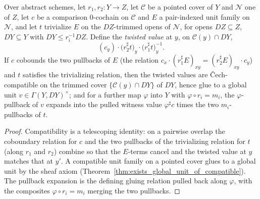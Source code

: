 \begin{theorem}
  \label{thm:exists_glued_unitsTrivTwist}
  \leanok
  Over abstract schemes, let \(r_1, r_2 \colon Y \to Z\), let \(\mathcal C\) be a pointed cover of
  \(Y\) and \(\mathcal N\) one of \(Z\), let \(c\) be a comparison \(0\)-cochain on \(\mathcal C\)
  and \(E\) a pair-indexed unit family on \(\mathcal N\), and let \(t\) trivialize \(E\) on the
  \(DZ\)-trimmed opens of \(\mathcal N\), for opens \(DZ \subseteq Z\), \(DY \subseteq Y\) with
  \(DY \le r_i^{-1}DZ\). Define the \emph{twisted value} at \(y\), on \(\mathcal C(y) \cap DY\),
  \[
    (c_y) \cdot \bigl(r_2^{\sharp}t\bigr)_y \cdot \bigl(r_1^{\sharp}t\bigr)_y^{-1} .
  \]
  If \(c\) cobounds the two pullbacks of \(E\) (the relation \(c_x \cdot (r_1^{\sharp}E)_{xy} =
  (r_2^{\sharp}E)_{xy} \cdot c_y\)) and \(t\) satisfies the trivializing relation, then the twisted
  values are \v Cech-compatible on the trimmed cover \(\{\mathcal C(y) \cap DY\}\) of \(DY\), hence
  glue to a global unit \(v \in \Gamma(Y, DY)^{\times}\); and for a further map \(\varphi\) into
  \(Y\) with \(\varphi \circ r_i = m_i\), the \(\varphi\)-pullback of \(v\) expands into the pulled
  witness value \(\varphi^{\sharp}c\) times the two \(m_i\)-pullbacks of \(t\).
\end{theorem}
\begin{proof}
  \leanok
  Compatibility is a telescoping identity: on a pairwise overlap the coboundary relation for \(c\)
  and the two pullbacks of the trivializing relation for \(t\) (along \(r_1\) and \(r_2\)) combine so
  that the \(E\)-terms cancel and the twisted value at \(y\) matches that at \(y'\). A compatible
  unit family on a pointed cover glues to a global unit by the sheaf axiom
  (Theorem~\ref{thm:exists_global_unit_of_compatible}). The pullback expansion is the defining
  gluing relation pulled back along \(\varphi\), with the composites \(\varphi \circ r_i = m_i\)
  merging the two pullbacks.
\end{proof}

